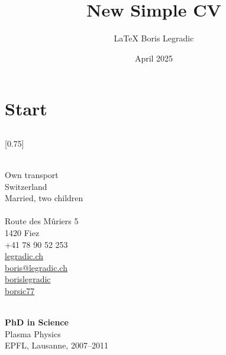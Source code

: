 \documentclass[verylight]{simplehipstercv}
\title{New Simple CV}
\author{\LaTeX{} Boris Legradic}
\date{April 2025}
\begin{document}
\thispagestyle{empty}

\section*{Start}
%

\subsection*{}
\vspace{4em}

\setlength{\columnsep}{1.5cm}
[0.75]
\begin{paracol}{2}
\paracolbackgroundoptions

\footnotesize
{\setasidefontcolour
\flushright

\bigskip \bigskip
\begin{center}
\end{center}
\bigskip \bigskip

\\[0.5em]
Own transport\\
Switzerland\\
Married, two children\\

\bigskip \bigskip
{}\\[0.5em]
Route des Mûriers 5\\
1420 Fiez\\
+41 78 90 52 253\\

\bigskip
\href{https://legradic.ch}{legradic.ch }\\
\href{mailto:boris@legradic.ch}{boris@legradic.ch }\\
\href{https://www.linkedin.com/in/borislegradic}{borislegradic }\\
\href{https://github.com/borsic77}{borsic77 }

\bigskip \bigskip
{}\\[0.5em]

\textbf{PhD in Science}\\
Plasma Physics\\
EPFL, Lausanne, 2007–2011\\[0.5em]

}
\end{paracol}
\end{document}
